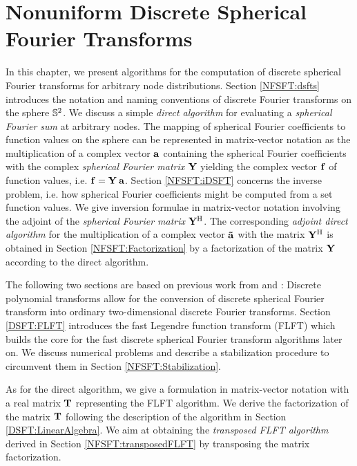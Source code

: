 \chapter{Nonuniform Discrete Spherical Fourier Transforms}
\label{DSFT}

In this chapter, we present algorithms for the computation of discrete
spherical Fourier transforms for arbitrary node distributions. 
Section \ref{NFSFT:dsfts} introduces the notation and naming conventions
of discrete Fourier transforms on the sphere $\mathbb{S}^2$. We discuss
a simple \emph{direct algorithm} for evaluating a \emph{spherical Fourier sum}
at arbitrary nodes. The mapping of spherical Fourier coefficients to function 
values on the sphere can be represented in matrix-vector notation as the
multiplication of a complex vector $\mathbf{a}$ containing the spherical Fourier 
coefficients with the complex \emph{spherical Fourier matrix} 
$\mathbf{Y}$ yielding the complex vector $\mathbf{f}$ of function values, i.e. 
$\mathbf{f} = \mathbf{Y} \: \mathbf{a}$. 
Section \ref{NFSFT:iDSFT} concerns the inverse problem, i.e. how spherical Fourier
coefficients might be computed from a set function values. We give inversion
formulae in matrix-vector notation involving the adjoint of the 
\emph{spherical Fourier matrix} $\mathbf{Y}^{\text{\rm{H}}}$. 
The corresponding \emph{adjoint direct algorithm} for the multiplication of
a complex vector $\mathbf{\tilde{a}}$ with the matrix $\mathbf{Y}^{\text{\rm{H}}}$ is 
obtained in Section \ref{NFSFT:Factorization} by a factorization of the 
matrix $\mathbf{Y}$ according to the direct algorithm.

The following two sections are based on previous work from 
\cite{postta97} and \cite{kupo02}:
Discrete polynomial transforms allow for the conversion of
discrete spherical Fourier transform into ordinary two-dimensional
discrete Fourier transforms. Section \ref{DSFT:FLFT} introduces
the fast Legendre function transform (FLFT) which builds the core
for the fast discrete spherical Fourier transform algorithms later 
on. We discuss numerical problems and describe a stabilization 
procedure to circumvent them in Section \ref{NFSFT:Stabilization}.

As for the direct algorithm, we give a formulation in matrix-vector notation 
with a real matrix $\mathbf{T}$ representing the FLFT algorithm.
We derive the factorization of the matrix $\mathbf{T}$ following the description of
the algorithm in Section \ref{DSFT:LinearAlgebra}. We aim at 
obtaining the \emph{transposed FLFT algorithm} derived in Section
\ref{NFSFT:transposedFLFT} by transposing the matrix factorization.

